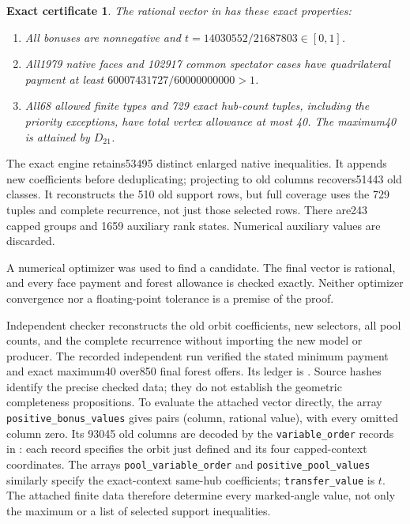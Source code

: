 \documentclass[11pt]{article}
\newtheorem{certificate}[theorem]{Exact certificate}
\begin{document}
\begin{certificate}\label{cert:40}
The rational vector in
has these exact properties:
\begin{enumerate}
\item All bonuses are nonnegative and
$t=14030552/21687803\in[0,1]$.
\item All1979 native faces and 102917 common spectator cases have
quadrilateral payment at least $60007431727/60000000000>1$.
\item All68 allowed finite types and 729 exact hub-count tuples, including
the priority exceptions, have total vertex allowance at most 40.
The maximum40 is attained by $D_{21}$.
\end{enumerate}
\end{certificate}
The exact engine retains53495 distinct enlarged native inequalities.
It appends new coefficients before deduplicating; projecting to old
columns recovers51443 old classes. It reconstructs the 510 old support
rows, but full coverage uses the 729 tuples and complete recurrence,
not just those selected rows. There are243 capped groups and 1659
auxiliary rank states. Numerical auxiliary values are discarded.

A numerical optimizer was used to find a candidate. The final vector
is rational, and every face payment and forest allowance is checked
exactly. Neither optimizer convergence nor a floating-point tolerance
is a premise of the proof.

Independent checker
reconstructs the old orbit coefficients, new selectors, all pool counts,
and the complete recurrence without importing the new model or producer.
The recorded independent run verified the stated minimum payment and
exact maximum40 over850 final forest offers. Its ledger is
.
Source hashes identify the precise checked data; they do not establish
the geometric completeness propositions.
To evaluate the attached vector directly, the array
\texttt{positive\_bonus\_values} gives pairs (column, rational value),
with every omitted column zero. Its 93045 old columns are decoded by
the \texttt{variable\_order} records in
:
each record specifies the orbit just defined and its four capped-context
coordinates. The arrays \texttt{pool\_variable\_order} and
\texttt{positive\_pool\_values} similarly specify the exact-context
same-hub coefficients; \texttt{transfer\_value} is $t$.
The attached finite data therefore determine every marked-angle value,
not only the maximum or a list of selected support inequalities.
\end{document}
